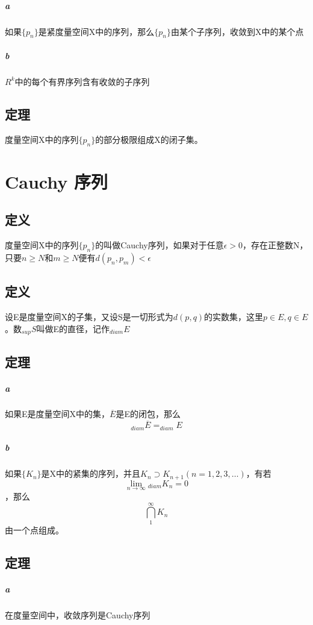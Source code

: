 \paragraph{a} 如果$\{p_n\}$是紧度量空间X中的序列，那么$\{p_n\}$由某个子序列，收敛到X中的某个点
\paragraph{b} $R^k$中的每个有界序列含有收敛的子序列
\section{定理} 度量空间X中的序列$\{p_n\}$的部分极限组成X的闭子集。
\subparagraph*{}
\chapter*{Cauchy 序列}
\section{定义} 度量空间X中的序列$\{p_n\}$的叫做Cauchy序列，如果对于任意$\epsilon > 0$，存在正整数N，只要$n \ge N$和$m \ge N$便有$d(p_n, p_m) < \epsilon$
\section{定义} 设E是度量空间X的子集，又设S是一切形式为$d(p, q)$的实数集，这里$p \in E, q \in E$。数$_{sup}S$叫做E的直径，记作$_{diam}E$
\section{定理} 
\paragraph{a} 如果E是度量空间X中的集，$\overline{E}$是E的闭包，那么$$ _{diam}\overline{E} = _{diam}E $$
\paragraph{b} 如果$\{ K_n \}$是X中的紧集的序列，并且$ K_n \supset K_{n+1} (n= 1, 2, 3, \dots)$，有若$$ \lim_{n \to \infty} {_{diam}K_n} = 0$$，那么$$\bigcap_1^{\infty}K_n$$由一个点组成。
\section{定理}
\paragraph{a} 在度量空间中，收敛序列是Cauchy序列
